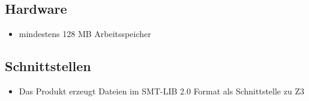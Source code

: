 \documentclass[a4paper,10pt]{article}
\begin{document}
\subsection{Hardware}
\begin{itemize}
  \item mindestens 128 MB Arbeitsspeicher
\end{itemize}

\subsection{Schnittstellen}
\begin{itemize}
  \item Das Produkt erzeugt Dateien im SMT-LIB 2.0 Format als Schnittstelle zu Z3
\end{itemize}
\end{document}
